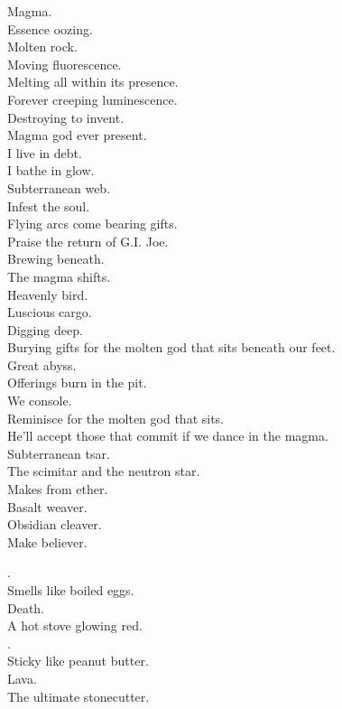 Magma. \\
Essence oozing. \\
Molten rock. \\
Moving fluorescence. \\
Melting all within its presence. \\
Forever creeping luminescence. \\
Destroying to invent. \\
Magma god ever present. \\
I live in debt. \\
I bathe in glow. \\
Subterranean web. \\
Infest the soul. \\
Flying arcs come bearing gifts. \\
Praise the return of G.I. Joe. \\
Brewing beneath. \\
The magma shifts. \\
Heavenly bird. \\
Luscious cargo. \\
Digging deep. \\
Burying gifts for the molten god that sits beneath our feet. \\
Great abyss. \\
Offerings burn in the pit. \\
We console. \\
Reminisce for the molten god that sits. \\
He'll accept those that commit if we dance in the magma. \\
Subterranean tsar. \\
The scimitar and the neutron star. \\
Makes from ether. \\
Basalt weaver. \\
Obsidian cleaver. \\
Make believer. \\




. \\
Smells like boiled eggs. \\
Death. \\
A hot stove glowing red. \\
. \\
Sticky like peanut butter. \\
Lava. \\
The ultimate stonecutter. \\

